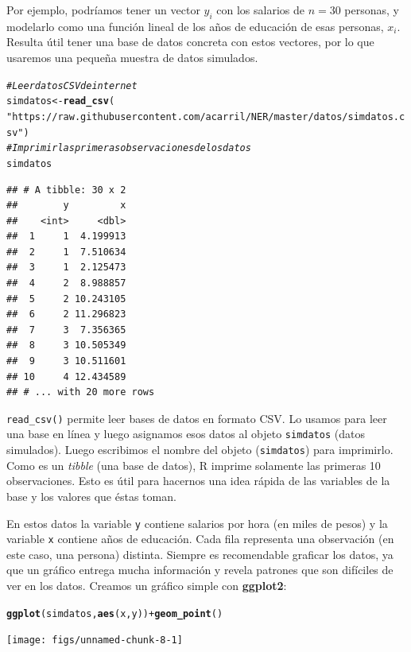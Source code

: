 \documentclass{report}\usepackage[]{graphicx}\usepackage[]{color}
\makeatletter
\newcommand{\hlstr}[1]{\textcolor[rgb]{0.192,0.494,0.8}{#1}}%
\newcommand{\hlcom}[1]{\textcolor[rgb]{0.678,0.584,0.686}{\textit{#1}}}%
\newcommand{\hlopt}[1]{\textcolor[rgb]{0,0,0}{#1}}%
\newcommand{\hlstd}[1]{\textcolor[rgb]{0.345,0.345,0.345}{#1}}%
\newcommand{\hlkwb}[1]{\textcolor[rgb]{0.69,0.353,0.396}{#1}}%
\newcommand{\hlkwd}[1]{\textcolor[rgb]{0.737,0.353,0.396}{\textbf{#1}}}%
\newenvironment{kframe}{%
 \def\at@end@of@kframe{}%
 \ifinner\ifhmode%
  \def\at@end@of@kframe{\end{minipage}}%
  \begin{minipage}{\columnwidth}%
 \fi\fi%
 \def\FrameCommand##1{\hskip\@totalleftmargin \hskip-\fboxsep
 \colorbox{shadecolor}{##1}\hskip-\fboxsep
     \hskip-\linewidth \hskip-\@totalleftmargin \hskip\columnwidth}%
 \MakeFramed {\advance\hsize-\width
   \@totalleftmargin\z@ \linewidth\hsize
   \@setminipage}}%
 {\par\unskip\endMakeFramed%
 \at@end@of@kframe}
\newenvironment{knitrout}{}{} %
\newcommand*{\eng}[1]{\textsl{#1}}
\newcommand*{\paq}[1]{\textbf{#1}\index{#1@\textbf{#1}}}
\makeatother
\begin{document}
Por ejemplo, podríamos tener un vector $y_i$ con los salarios de $n=30$ personas, y modelarlo como una función lineal de los años de educación de esas personas, $x_i$. Resulta útil tener una base de datos concreta con estos vectores, por lo que usaremos una pequeña muestra de datos simulados.

\begin{knitrout}
\color{fgcolor}\begin{kframe}
\begin{alltt}
\hlcom{# Leer datos CSV de internet}
\hlstd{simdatos} \hlkwb{<-} \hlkwd{read_csv}\hlstd{(}
  \hlstr{"https://raw.githubusercontent.com/acarril/NER/master/datos/simdatos.csv"}\hlstd{)}
\hlcom{# Imprimir las primeras observaciones de los datos}
\hlstd{simdatos}
\end{alltt}
\begin{verbatim}
## # A tibble: 30 x 2
##        y         x
##    <int>     <dbl>
##  1     1  4.199913
##  2     1  7.510634
##  3     1  2.125473
##  4     2  8.988857
##  5     2 10.243105
##  6     2 11.296823
##  7     3  7.356365
##  8     3 10.505349
##  9     3 10.511601
## 10     4 12.434589
## # ... with 20 more rows
\end{verbatim}
\end{kframe}
\end{knitrout}

\begin{Rbox}
\verb|read_csv()| permite leer bases de datos en formato CSV. Lo usamos para leer una base en línea y luego asignamos esos datos al objeto \verb|simdatos| (datos simulados).
Luego escribimos el nombre del objeto (\verb|simdatos|) para imprimirlo. Como es un \eng{tibble} (una base de datos), R imprime solamente las primeras 10 observaciones.
Esto es útil para hacernos una idea rápida de las variables de la base y los valores que éstas toman.
\end{Rbox}

En estos datos la variable \verb|y| contiene salarios por hora (en miles de pesos) y la variable \verb|x| contiene años de educación.
Cada fila representa una observación (en este caso, una persona) distinta.
Siempre es recomendable graficar los datos, ya que un gráfico entrega mucha información y revela patrones que son difíciles de ver en los datos. Creamos un gráfico simple con \paq{ggplot2}:

\begin{knitrout}
\color{fgcolor}\begin{kframe}
\begin{alltt}
\hlkwd{ggplot}\hlstd{(simdatos,} \hlkwd{aes}\hlstd{(x, y))} \hlopt{+} \hlkwd{geom_point}\hlstd{()}
\end{alltt}
\end{kframe}

{\centering \texttt{[image: figs/unnamed-chunk-8-1]} 

}



\end{knitrout}
\end{document}
